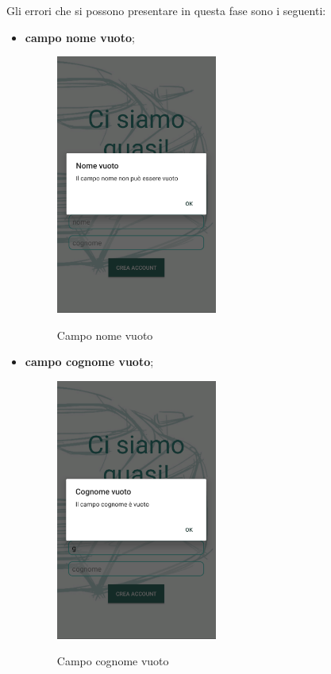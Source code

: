 \pagebreak
Gli errori che si possono presentare in questa fase sono i seguenti:
\begin{itemize}
	\item \textbf{campo nome vuoto};
	\begin{figure}[H] 
		\centering 
		\includegraphics[width=0.5\textwidth]{res/images/errore_nome.png}\\
		\caption{Campo nome vuoto}
		\label{error_name}
	\end{figure}
	\pagebreak
	\item \textbf{campo cognome vuoto};
	\begin{figure}[H] 
		\centering 
		\includegraphics[width=0.5\textwidth]{res/images/errore_cognome.png}\\
		\caption{Campo cognome vuoto}
		\label{error_surname}
	\end{figure}
\end{itemize}


